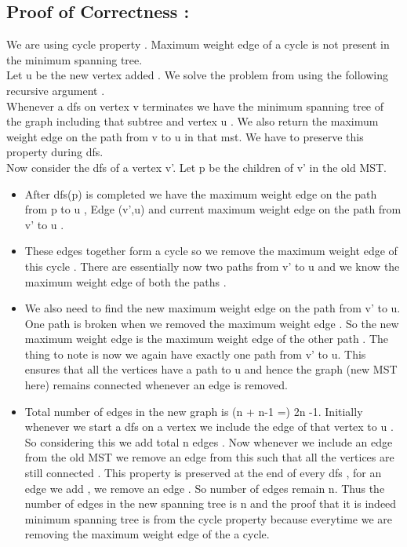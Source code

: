\documentclass[11pt]{article}
\begin{document}
\subsection*{Proof of Correctness :}
We are using cycle property . Maximum weight edge of a cycle is not present in the minimum spanning tree. \\
Let u be the new vertex added . We solve the problem from using the following recursive argument . \\
Whenever a dfs on vertex v terminates we have the minimum spanning tree of the graph including that subtree and vertex u . We also return the maximum weight edge on the path from v to u in that mst. We have to preserve this property during dfs.   \\
Now consider the dfs of a vertex v'. Let p be the children of v' in the old MST. 
\begin{itemize}
\item After dfs(p) is completed we have the maximum weight edge on the path from p to u , Edge (v',u) and  current maximum weight edge on the path from v' to u .
\item These edges together form a cycle so we remove the maximum weight edge of this cycle . There are essentially now two paths from v' to u and we know the maximum weight edge of both the paths . 
\item We also need to find the new maximum weight edge on the path from v' to u. One path is broken when we removed the maximum weight edge . So the new maximum weight edge is the maximum weight edge of the other path . The thing to note is now we again have exactly one path from v' to u. This  ensures that all the vertices have a path to u and hence the graph (new MST here) remains connected whenever an edge is removed.
\item Total number of edges in the new graph is (n + n-1 =) 2n -1.  Initially whenever we start a dfs on a vertex we include the edge of that vertex to u . So considering this we add total n edges . Now whenever we include an edge from the old MST we remove an edge from this such that all the vertices are still connected . This property is preserved at the end of every dfs , for an edge we add , we remove an edge . So number of edges remain n. Thus the number of edges in the new  spanning tree is n and the proof that it is indeed minimum spanning tree is from the cycle property because everytime we are removing the maximum weight edge of the a cycle. 
\end{itemize}



\pagebreak
\end{document}
